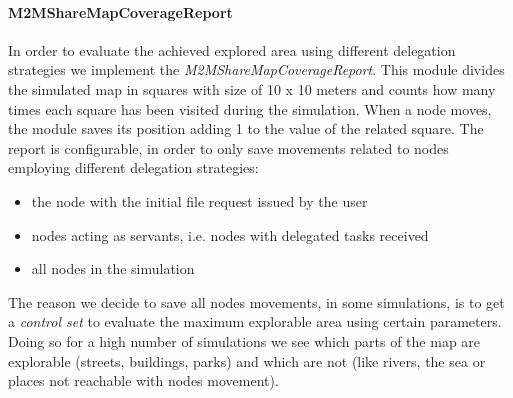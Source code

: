 \paragraph{M2MShareMapCoverageReport}
In order to evaluate the achieved explored area using different delegation strategies we implement the \textit{M2MShareMapCoverageReport}. This module divides the simulated map in squares with size of 10 x 10 meters and counts how many times each square has been visited during the simulation. When a node moves, the module saves its position adding 1 to the value of the related square. The report is configurable, in order to only save movements related to nodes employing different delegation strategies:
\begin{itemize}
\item the node with the initial file request issued by the user
\item nodes acting as servants, i.e. nodes with delegated tasks received
\item all nodes in the simulation
\end{itemize}
The reason we decide to save all nodes movements, in some simulations, is to get a \textit{control set} to evaluate the maximum explorable area using certain parameters. Doing so for a high number of simulations we see which parts of the map are explorable (streets, buildings, parks) and which are not (like rivers, the sea or places not reachable with nodes movement).

%


